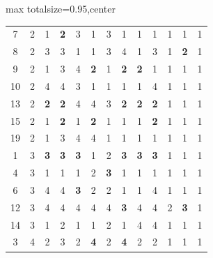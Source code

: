 \documentclass[12pt,reqno]{amsart}
\begin{document}
\begin{landscape}
\begin{adjustbox}{max totalsize={\linewidth}{0.95\vsize},center}
\begin{minipage}{\linewidth}
\begin{tabular}{@{}cc*{11}{c}@{}}
\addlinespace[2pt]

7 & 2
& 1 & \textcolor{goodblue}{\bfseries 2}
& 3 & 1 & 3 & 1 & 1 & 1 & 1 & 1 & 1 \\

8 & 2
& 3 & 3 & 1 & 1 & 3 & 4 & 1 & 3 & 1
& \textcolor{goodblue}{\bfseries 2}
& 1 \\

9 & 2
& 1 & 3 & 4
& \textcolor{goodblue}{\bfseries 2}
& 1
& \textcolor{goodblue}{\bfseries 2}
& \textcolor{goodblue}{\bfseries 2}
& 1 & 1 & 1 & 1 \\

10 & 2
& 4 & 4 & 3 & 1 & 1 & 1 & 1 & 4 & 1 & 1 & 1 \\

13 & 2
& \textcolor{goodblue}{\bfseries 2}
& \textcolor{goodblue}{\bfseries 2}
& 4 & 4 & 3 & \textcolor{goodblue}{\bfseries 2}
& \textcolor{goodblue}{\bfseries 2}
& \textcolor{goodblue}{\bfseries 2}
& 1 & 1 & 1 \\

15 & 2
& 1 & \textcolor{goodblue}{\bfseries 2}
& 1
& \textcolor{goodblue}{\bfseries 2}
& 1 & 1 & 1
& \textcolor{goodblue}{\bfseries 2}
& 1 & 1 & 1 \\

19 & 2
& 1 & 3 & 4 & 4 & 1 & 1 & 1 & 1 & 1 & 1 & 1 \\

\addlinespace[2pt]

1 & 3
& \textcolor{goodblue}{\bfseries 3}
& \textcolor{goodblue}{\bfseries 3}
& \textcolor{goodblue}{\bfseries 3}
& 1 & 2 & \textcolor{goodblue}{\bfseries 3}
& \textcolor{goodblue}{\bfseries 3}
& \textcolor{goodblue}{\bfseries 3}
& 1 & 1 & 1 \\

4 & 3
& 1 & 1 & 1 & 2
& \textcolor{goodblue}{\bfseries 3}
& 1 & 1 & 1 & 1 & 1 & 1 \\

6 & 3
& 4 & 4
& \textcolor{goodblue}{\bfseries 3}
& 2 & 2 & 1 & 1 & 4 & 1 & 1 & 1 \\

12 & 3
& 4 & 4 & 4 & 4 & 4 & \textcolor{goodblue}{\bfseries 3}
& 4 & 4 & 2
& \textcolor{goodblue}{\bfseries 3}
& 1 \\

14 & 3
& 1 & 2 & 1 & 1 & 2 & 1 & 4 & 4 & 1 & 1 & 1 \\

\addlinespace[2pt]

3 & 4
& 2 & 3 & 2
& \textcolor{goodblue}{\bfseries 4}
& 2 & \textcolor{goodblue}{\bfseries 4}
& 2 & 2 & 1 & 1 & 1 \\


\end{tabular}
\end{minipage}
\end{adjustbox}
\end{landscape}
\end{document}
